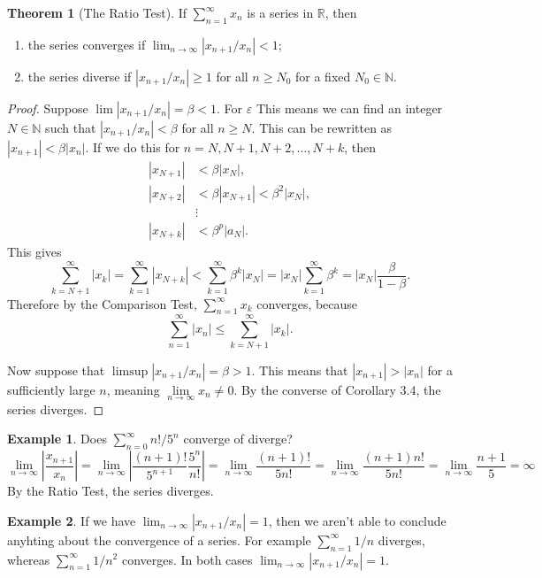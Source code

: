 \documentclass{article}
\newcommand{\N}{\mathbb{N}}
\newcommand{\R}{\mathbb{R}}
\theoremstyle{definition}
\newtheorem{theorem}{Theorem}[section]
\newtheorem{example}{Example}[section]
\begin{document}
\begin{theorem}[The Ratio Test]
	If $ \sum_{n=1}^{\infty}x_n  $ is a series in $ \R $, then
	\begin{enumerate}
		\item the series converges if $ \lim_{n\to\infty}|x_{n+1}/x_n|<1 $;
		\item the series diverse if $ |x_{n+1}/x_n|\ge 1 $ for all $ n\ge N_0 $ for a fixed $ N_0\in\N $.
	\end{enumerate} 
\end{theorem}
\begin{proof}
	Suppose $ \lim |x_{n+1}/x_n|=\beta<1 $. For $ \varepsilon $ This means we can find an integer $ N\in\N $ such that $|x_{n+1}/x_n|<\beta $ for all $ n\ge N $. This can be rewritten as $ |x_{n+1}|<\beta|x_n| $. If we do this for $ n=N,N+1,N+2,\ldots ,N+k $, then \begin{align*}
		|x_{N+1}|&<\beta|x_N|,\\
		|x_{N+2}|&<\beta|x_{N+1}|<\beta^2|x_{N}|,\\
		&\vdots\\
		|x_{N+k}|&<\beta^p|a_N|.
	\end{align*}
This gives $$ \sum_{k=N+1}^{\infty}|x_k|=\sum_{k=1}^{\infty}|x_{N+k}|<\sum_{k=1}^{\infty}\beta^k|x_N|=|x_N|\sum_{k=1}^\infty \beta ^k=|x_N|\frac{\beta}{1-\beta}.$$	Therefore by the Comparison Test, $ \sum_{n=1}^{\infty}x_k $ converges, because $$ \sum_{n=1}^{\infty}|x_n|\le\sum_{k=N+1}^{\infty}|x_k|.$$

Now suppose that $ \limsup|x_{n+1}/x_n|=\beta>1 $. This means that $ |x_{n+1}|>|x_n| $ for a sufficiently large $ n $, meaning $ \lim\limits_{n\to\infty}x_n\neq 0 $. By the converse of Corollary 3.4, the series diverges.  
\end{proof}
\begin{example}
	Does $ \sum_{n=0}^{\infty}n!/5^n $ converge of diverge? 
	$$\lim\limits_{n\to\infty}\left\lvert \frac{x_{n+1}}{x_n}\right\rvert=\lim\limits_{n\to\infty}\left\lvert \frac{(n+1)!}{5^{n+1}}\frac{5^n}{n!}\right\rvert=\lim\limits_{n\to\infty}\frac{(n+1)!}{5n!}=\lim\limits_{n\to\infty}\frac{(n+1)n!}{5n!}=\lim\limits_{n\to\infty}\frac{n+1}{5}=\infty$$ By the Ratio Test, the series diverges. 
\end{example}
\begin{example}
	If we have $ \lim_{n\to\infty}|x_{n+1}/x_n|=1 $, then we aren't able to conclude anyhting about the convergence of a series. For example $ \sum_{n=1}^{\infty}1/n $ diverges, whereas  $ \sum_{n=1}^{\infty}1/n^2 $ converges. In both cases $ \lim_{n\to\infty}|x_{n+1}/x_n|=1 $. 	
\end{example}
\end{document}
